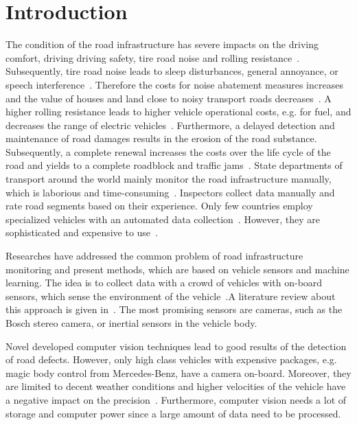 \chapter{Introduction}
\label{intro}

The condition of the road infrastructure has severe impacts on the driving comfort, driving driving safety, tire road noise and rolling resistance~\cite{ihs_influence_2005, sandberg_road_1987-1, descornet_road-surface_1990, masino_identification_2017}.
%
Subsequently, tire road noise leads to sleep disturbances, general annoyance, or speech interference~\cite{ohrstrom_effects_2006, schwela_world_2000}. 
%
Therefore the costs for noise abatement measures increases~\cite{bmvi_statistik_2015} and the value of houses and land close to noisy transport roads decreases~\cite{taylor_effect_1982, wilhelmsson_impact_2000, Theebe2004}.
%
A higher rolling resistance leads to higher vehicle operational costs, e.g. for fuel, and decreases the range of electric vehicles~\cite{barrand2008reducing}.
%
Furthermore, a delayed detection and maintenance of road damages results in the erosion of the road substance. Subsequently, a complete renewal increases the costs over the life cycle of the road and yields to a complete roadblock and traffic jams~\cite{forschungsgesellschaft_fur_strassen-_und_verkehrswesen_merkblatt_2004}. 
%
State departments of transport around the world mainly monitor the road infrastructure manually, which is laborious and time-consuming~\cite{radopoulou_improving_2016}.
%
Inspectors collect data manually and rate road segments based on their experience.
%
Only few countries employ specialized vehicles with an automated data collection~\cite{koch2011pothole}. 
%
However, they are sophisticated and expensive to use~\cite{radopoulou_improving_2016}.

Researches have addressed the common problem of road infrastructure monitoring and present methods, which are based on vehicle sensors and machine learning. 
%
The idea is to collect data with a crowd of vehicles with on-board sensors, which sense the environment of the vehicle~\cite{radopoulou_automated_2016}.A literature review about this approach is given in~\cite{radopoulou_automated_2016}.
%
The most promising sensors are cameras, such as the Bosch stereo camera, or inertial sensors in the vehicle body.

Novel developed computer vision techniques lead to good results of the detection of road defects.
%
However, only high class vehicles with expensive packages, e.g. magic body control from Mercedes-Benz, have a camera on-board.
%
Moreover, they are limited to decent weather conditions and higher velocities of the vehicle have a negative impact on the precision~\cite{radopoulou_automated_2016}.
%
Furthermore, computer vision needs a lot of storage and computer power since a large amount of data need to be processed.

